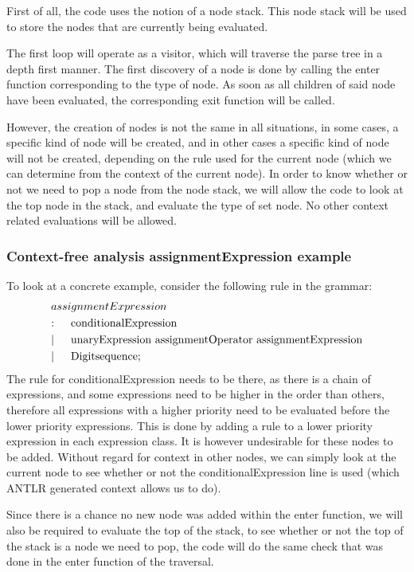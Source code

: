 \documentclass[12pt]{article}
\begin{document}
First of all, the code uses the notion of a node stack. This node stack will be used to store the nodes that are currently being evaluated.

The first loop will operate as a visitor, which will traverse the parse tree in a depth first manner. The first discovery of a node is done by calling the enter function corresponding to the type of node. As soon as all children of said node have been evaluated, the corresponding exit function will be called. 

However, the creation of nodes is not the same in all situations, in some cases, a specific kind of node will be created, and in other cases a specific kind of node will not be created, depending on the rule used for the current node (which we can determine from the context of the current node). In order to know whether or not we need to pop a node from the node stack, we will allow the code to look at the top node in the stack, and evaluate the type of set node. No other context related evaluations will be allowed.

\subsubsection{Context-free analysis assignmentExpression example}
To look at a concrete example, consider the following rule in the grammar:
\begin{align*}
	&assignmentExpression\\
	&\text{:}\indent \text{conditionalExpression}\\
	&|\indent \text{unaryExpression assignmentOperator assignmentExpression}\\
	&|\indent \text{Digitsequence}; \\
\end{align*}
The rule for conditionalExpression needs to be there, as there is a chain of expressions, and some expressions need to be higher in the order than others, therefore all expressions with a higher priority need to be evaluated before the lower priority expressions. This is done by adding a rule to a lower priority expression in each expression class. It is however undesirable for these nodes to be added. Without regard for context in other nodes, we can simply look at the current node to see whether or not the conditionalExpression line is used (which ANTLR generated context allows us to do).

Since there is a chance no new node was added within the enter function, we will also be required to evaluate the top of the stack, to see whether or not the top of the stack is a node we need to pop, the code will do the same check that was done in the enter function of the traversal.
\end{document}
